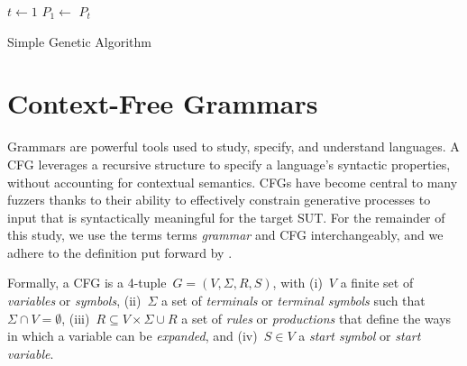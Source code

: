 \begin{algorithm}
	\BlankLine
	\DontPrintSemicolon
	
	$t \leftarrow 1$\;
	$P_1 \leftarrow $ \;
	\Return $P_t$\;

	\caption{Simple Genetic Algorithm}
	\label{alg:sga}
\end{algorithm}


\section{Context-Free Grammars}

Grammars are powerful tools used to study, specify,
and understand languages. 
A \Gls{CFG} leverages a recursive structure to
specify a language's syntactic properties, without accounting for
contextual semantics.
\gls{CFG}s have become central to many fuzzers thanks to their ability 
to effectively constrain generative processes to
input that is syntactically meaningful for the target \gls{SUT}.
For the remainder of this study, we use the terms terms \textit{grammar} 
and \gls{CFG} interchangeably, and we adhere to the definition put forward
by \citet{sipser1996introduction}.

Formally, a \gls{CFG} is a 4-tuple~$G=(V, \Sigma, R, S)$,
with (i)~$V$ a finite set of \textit{variables} or \textit{symbols},
(ii)~$\Sigma$ a set of \textit{terminals} or \textit{terminal symbols} 
such that $\Sigma \cap V = \emptyset$,
(iii)~$R \subseteq V \times \Sigma \cup R$
a set of \textit{rules} or \textit{productions} that define the ways in which a variable can be \textit{expanded}, and (iv)~$S \in V$ a \textit{start symbol} or \textit{start variable}.

